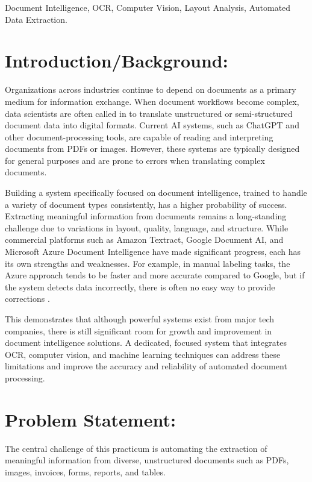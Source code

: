 \documentclass[12pt, onecolumn]{IEEEtran}
\begin{document}
\begin{IEEEkeywords}
Document Intelligence, OCR, Computer Vision, Layout Analysis, Automated Data Extraction.
\end{IEEEkeywords}

\section{\textbf{Introduction/Background:}}
Organizations across industries continue to depend on documents as a primary medium for information exchange. When document workflows become complex, data scientists are often called in to translate unstructured or semi-structured document data into digital formats. Current AI systems, such as ChatGPT and other document-processing tools, are capable of reading and interpreting documents from PDFs or images. However, these systems are typically designed for general purposes and are prone to errors when translating complex documents.

Building a system specifically focused on document intelligence, trained to handle a variety of document types consistently, has a higher probability of success. Extracting meaningful information from documents remains a long-standing challenge due to variations in layout, quality, language, and structure. While commercial platforms such as Amazon Textract, Google Document AI, and Microsoft Azure Document Intelligence have made significant progress, each has its own strengths and weaknesses. For example, in manual labeling tasks, the Azure approach tends to be faster and more accurate compared to Google, but if the system detects data incorrectly, there is often no easy way to provide corrections \cite{persumi2024}.

This demonstrates that although powerful systems exist from major tech companies, there is still significant room for growth and improvement in document intelligence solutions. A dedicated, focused system that integrates OCR, computer vision, and machine learning techniques can address these limitations and improve the accuracy and reliability of automated document processing.

\section{\textbf{Problem Statement:}}
The central challenge of this practicum is automating the extraction of meaningful information from diverse, unstructured documents such as PDFs, images, invoices, forms, reports, and tables. 
\end{document}
